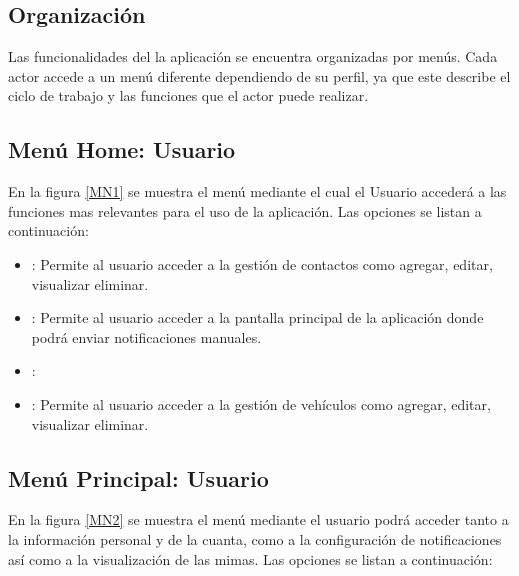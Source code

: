 
\subsection{Organización}
Las funcionalidades del la aplicación se encuentra organizadas por menús. Cada actor accede a un menú diferente dependiendo de su perfil, ya que este describe el ciclo de trabajo y las funciones que el actor puede realizar.


\hypertarget{menu:Usuario}{}	
\subsection{Menú Home: Usuario}
En la figura \ref{MN1} se muestra el menú mediante el cual el Usuario accederá a las funciones mas relevantes para el uso de la aplicación. Las opciones se listan a continuación:

\begin{itemize}
	\item {} : Permite al usuario acceder a la gestión de contactos como agregar, editar, visualizar eliminar.
	\item \btnHome [Home] : Permite al usuario acceder a la pantalla principal de la aplicación donde podrá enviar notificaciones manuales.
	\item {} : 
	\item {} : Permite al usuario acceder a la gestión de vehículos como agregar, editar, visualizar eliminar.
\end{itemize}


\pagebreak

\hypertarget{menu:UsuarioP}{}	
\subsection{Menú Principal: Usuario}
En la figura \ref{MN2} se muestra el menú mediante el usuario podrá acceder tanto a la información personal y de la cuanta, como a la configuración de notificaciones así como a la visualización de las mimas. Las opciones se listan a continuación:

